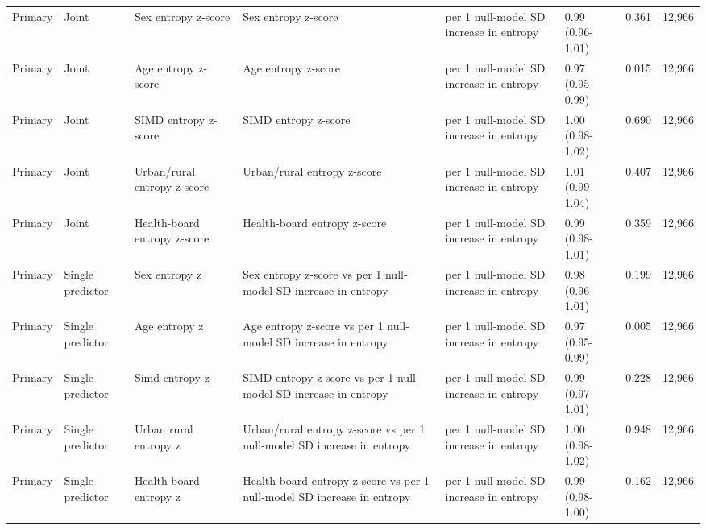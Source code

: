 \documentclass[10pt,letterpaper]{article}
\begin{document}
\begin{center}
{\begin{tabular}{llllllll}
Primary & Joint & Sex entropy z-score & Sex entropy z-score & per 1 null-model SD increase in entropy & 0.99 (0.96-1.01) & 0.361 & 12,966 \\
Primary & Joint & Age entropy z-score & Age entropy z-score & per 1 null-model SD increase in entropy & 0.97 (0.95-0.99) & 0.015 & 12,966 \\
Primary & Joint & SIMD entropy z-score & SIMD entropy z-score & per 1 null-model SD increase in entropy & 1.00 (0.98-1.02) & 0.690 & 12,966 \\
Primary & Joint & Urban/rural entropy z-score & Urban/rural entropy z-score & per 1 null-model SD increase in entropy & 1.01 (0.99-1.04) & 0.407 & 12,966 \\
Primary & Joint & Health-board entropy z-score & Health-board entropy z-score & per 1 null-model SD increase in entropy & 0.99 (0.98-1.01) & 0.359 & 12,966 \\
Primary & Single predictor & Sex entropy z & Sex entropy z-score vs per 1 null-model SD increase in entropy & per 1 null-model SD increase in entropy & 0.98 (0.96-1.01) & 0.199 & 12,966 \\
Primary & Single predictor & Age entropy z & Age entropy z-score vs per 1 null-model SD increase in entropy & per 1 null-model SD increase in entropy & 0.97 (0.95-0.99) & 0.005 & 12,966 \\
Primary & Single predictor & Simd entropy z & SIMD entropy z-score vs per 1 null-model SD increase in entropy & per 1 null-model SD increase in entropy & 0.99 (0.97-1.01) & 0.228 & 12,966 \\
Primary & Single predictor & Urban rural entropy z & Urban/rural entropy z-score vs per 1 null-model SD increase in entropy & per 1 null-model SD increase in entropy & 1.00 (0.98-1.02) & 0.948 & 12,966 \\
Primary & Single predictor & Health board entropy z & Health-board entropy z-score vs per 1 null-model SD increase in entropy & per 1 null-model SD increase in entropy & 0.99 (0.98-1.00) & 0.162 & 12,966 \\
\bottomrule
\end{tabular}}\end{center}
\vspace{1.5em}
\end{document}
